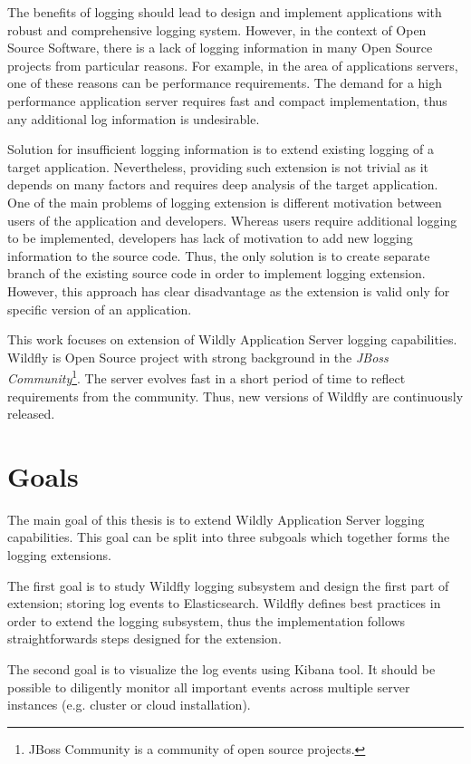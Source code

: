 \documentclass[12pt,oneside]{fithesis2}
\begin{document}
The benefits of logging should lead to design and implement applications with robust and comprehensive logging system. However, in the context of Open Source Software, there is a lack of logging information in many Open Source projects from particular reasons. For example, in the area of applications servers, one of these reasons can be performance requirements. The demand for a high performance application server requires fast and compact implementation, thus any additional log information is undesirable.

Solution for insufficient logging information is to extend existing logging of a target application. Nevertheless, providing such extension is not trivial as it depends on many factors and requires deep analysis of the target application. One of the main problems of logging extension is different motivation between users of the application and developers. Whereas users require additional logging to be implemented, developers has lack of motivation to add new logging information to the source code. Thus, the only solution is to create separate branch of the existing source code in order to implement logging extension. However, this approach has clear disadvantage as the extension is valid only for specific version of an application.

This work focuses on extension of Wildly Application Server logging capabilities. Wildfly is Open Source project with strong background in the \textit{JBoss Community}\footnote{JBoss Community is a community of open source projects.}. The server evolves fast in a short period of time to reflect requirements from the community. Thus, new versions of Wildfly are continuously released.

\section{Goals}
The main goal of this thesis is to extend Wildly Application Server logging capabilities. This goal can be split into three subgoals which together forms the logging extensions.

The first goal is to study Wildfly logging subsystem and design the first part of extension; storing log events to Elasticsearch. Wildfly defines best practices in order to extend the logging subsystem, thus the implementation follows straightforwards steps designed for the extension.

The second goal is to visualize the log events using Kibana tool. It should be possible to diligently monitor all important events across multiple server instances (e.g. cluster or cloud installation).
\end{document}
